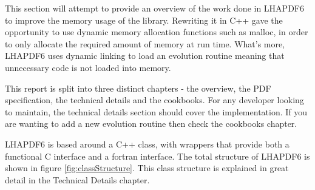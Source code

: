 This section will attempt to provide an overview of the work done in 
LHAPDF6 to improve the memory usage of the library. Rewriting it in C++ 
gave the opportunity to use dynamic memory allocation functions such as 
malloc, in order to only allocate the required amount of memory at run 
time. What's more, LHAPDF6 uses dynamic linking to load an evolution 
routine meaning that unnecessary code is not loaded into memory.

This report is split into three distinct chapters - the overview, the PDF
specification, the technical details and the cookbooks. For any developer 
looking to maintain, the technical details section should cover the 
implementation. If you are wanting to add a new evolution routine then 
check the cookbooks chapter.

LHAPDF6 is based around a C++ class, with wrappers that provide both a 
functional C interface and a fortran interface. The total structure of 
LHAPDF6 is shown in figure \ref{fig:classStructure}. This class structure
is explained in great detail in the Technical Details chapter.

